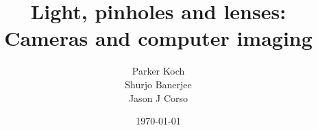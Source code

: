 % 
%

%


\title{Light, pinholes and lenses: Cameras and computer imaging}
\date{\today}
\author{Parker Koch\\ Shurjo Banerjee\\ Jason J Corso}
\providecommand{\hl}[1]{{\color{red}{#1}}}


\maketitle

